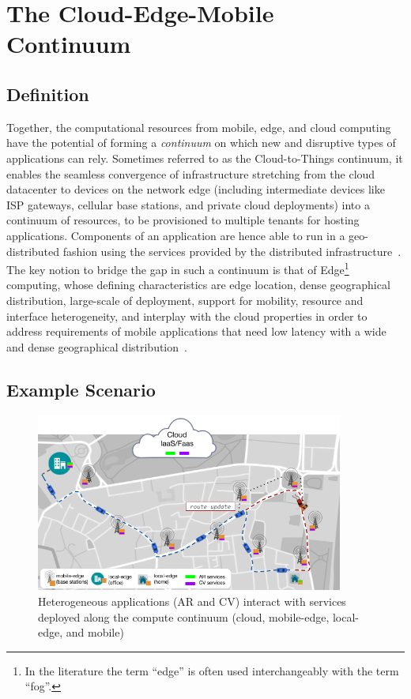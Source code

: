 \section{The Cloud-Edge-Mobile Continuum}\label{sec:requirements}

\subsection{Definition}

Together, the computational resources from mobile, edge, and cloud computing have the potential of forming a \textit{continuum} on which new and disruptive types of applications can rely. Sometimes referred to as the Cloud-to-Things continuum, it enables the seamless convergence of infrastructure stretching from the cloud datacenter to devices on the network edge (including intermediate devices like ISP gateways, cellular base stations, and private cloud deployments) into a continuum of resources, to be provisioned to multiple tenants for hosting applications. Components of an application are hence able to run in a geo-distributed fashion using the services provided by the distributed infrastructure~\cite{GuptaIfogSim17}. The key notion to bridge the gap in such a continuum is that of Edge\footnote{In the literature the term ``edge'' is often used interchangeably with the term ``fog''.} computing, whose defining characteristics are edge location, dense geographical distribution, large-scale of deployment, support for mobility, resource and interface heterogeneity, and interplay with the cloud properties in order to address requirements of mobile applications that need low latency with a wide and dense geographical distribution~\cite{Bonomi2014}.  

\subsection{Example Scenario}

\begin{figure}[tbp]
	\includegraphics[width=0.9\textwidth]{figs/continuum.png}
	\caption{Heterogeneous applications (AR and CV) interact with services deployed along the compute continuum (cloud, mobile-edge, local-edge, and mobile)}
	\label{fig:continuum-scenario}
\end{figure}



